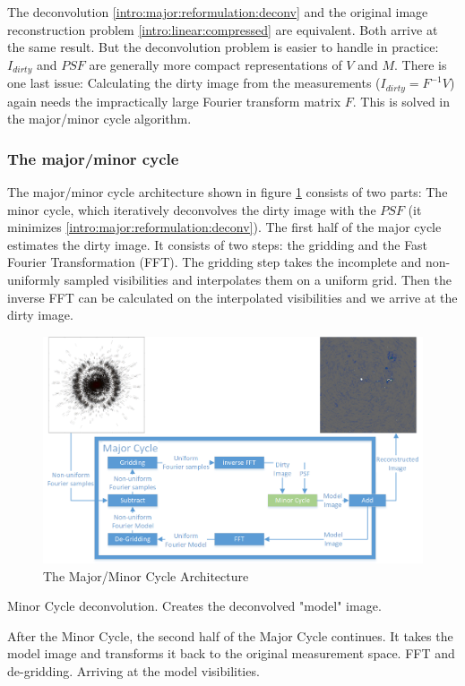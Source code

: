 The deconvolution \eqref{intro:major:reformulation:deconv} and the original image reconstruction problem \eqref{intro:linear:compressed} are equivalent. Both arrive at the same result. But the deconvolution problem is easier to handle in practice: $I_{dirty}$ and $PSF$ are generally more compact representations of $V$ and $M$. There is one last issue: Calculating the dirty image from the measurements ($I_{dirty} = F^{-1}V$) again needs the impractically large Fourier transform matrix $F$. This is solved in the major/minor cycle algorithm.

\subsubsection{The major/minor cycle}
The major/minor cycle architecture shown in figure \ref{intro:major:fig} consists of two parts: The minor cycle, which iteratively deconvolves the dirty image with the $PSF$ (it minimizes \eqref{intro:major:reformulation:deconv}). The first half of the major cycle estimates the dirty image. It consists of two steps: the gridding and the Fast Fourier Transformation (FFT). The gridding step takes the incomplete and non-uniformly sampled visibilities and interpolates them on a uniform grid. Then the inverse FFT can be calculated on the interpolated visibilities and we arrive at the dirty image.

\begin{figure}[h]
	\centering
	\includegraphics[width=0.90\linewidth]{./chapters/02.hypo/Major-Minor3.png}
	\caption{The Major/Minor Cycle Architecture}
	\label{intro:major:fig}
\end{figure}

Minor Cycle deconvolution. Creates the deconvolved "model" image.

After the Minor Cycle, the second half of the Major Cycle continues. It takes the model image and transforms it back to the original measurement space. FFT and de-gridding. Arriving at the model visibilities.

